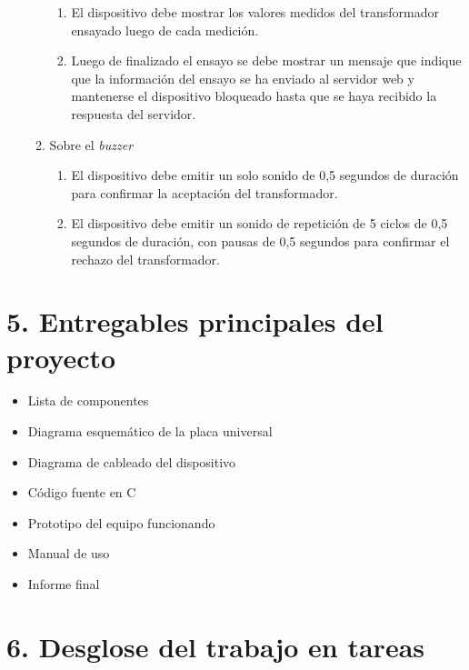 \documentclass[11pt]{charter}
\begin{document}
\begin{enumerate}
\begin{enumerate}
\begin{enumerate}
		\item El dispositivo debe mostrar los valores medidos del transformador ensayado luego de cada medición.
		\item Luego de finalizado el ensayo se debe mostrar un mensaje que indique que la información del ensayo se ha enviado al servidor web y mantenerse el dispositivo bloqueado hasta que se haya recibido la respuesta del servidor.
		\end{enumerate}
	\item Sobre el \textit{buzzer}
		\begin{enumerate}
		\item El dispositivo debe emitir un solo sonido de 0,5 segundos de duración para confirmar la aceptación del transformador.
		\item El dispositivo debe emitir un sonido de repetición de 5 ciclos de 0,5 segundos de duración, con pausas de 0,5 segundos para confirmar el rechazo del transformador.
		\end{enumerate}		
	\end{enumerate}
\end{enumerate}





\section{5. Entregables principales del proyecto}
\label{sec:entregables}


\begin{itemize}
\item Lista de componentes
\item Diagrama esquemático de la placa universal
\item Diagrama de cableado del dispositivo
\item Código fuente en C
\item Prototipo del equipo funcionando
\item Manual de uso
\item Informe final
\end{itemize}



\section{6. Desglose del trabajo en tareas}
\label{sec:wbs}
\end{document}
